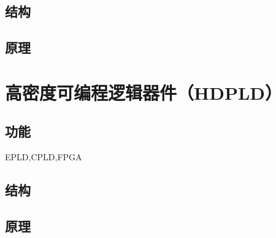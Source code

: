 \subsection{结构}

\subsection{原理}


\newpage
\section{高密度可编程逻辑器件（HDPLD）}

\subsection{功能}

EPLD,CPLD,FPGA

\subsection{结构}

\subsection{原理}



\newpage
